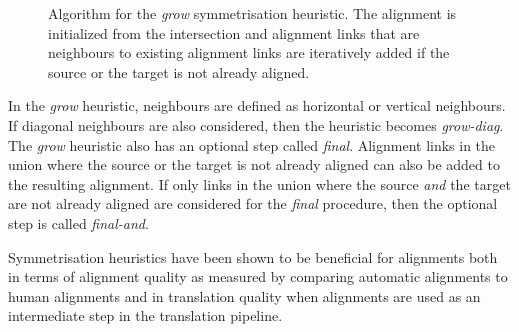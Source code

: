\begin{figure}
  \begin{algorithmic}[1]
       \hypertarget{alg:line:initGrow}{} \label{alg:line:initGrow}
             \hypertarget{alg:line:neighbours}{} \label{alg:line:neighbours}
               \hypertarget{alg:line:notAlreadyAligned}{} \label{alg:line:notAlreadyAligned}
                 \hypertarget{alg:line:addLink}{} \label{alg:line:addLink}
              \EndIf
            \EndFor
            \EndIf
          \EndFor
        \EndFor
        \EndIf
      \EndWhile
    \EndFunction
  \end{algorithmic}
  \caption{Algorithm for the \emph{grow} symmetrisation heuristic.
    The alignment is initialized from the intersection and alignment links
    that are neighbours to existing alignment links are iteratively added if the source
    or the target is not already aligned.}
  \label{alg:growHeuristic}
\end{figure}

In the \emph{grow} heuristic, neighbours are defined as horizontal or
vertical neighbours. If diagonal neighbours are also considered, then
the heuristic becomes \emph{grow-diag}. The \emph{grow} heuristic
also has an optional step called \emph{final}. Alignment
links in the union where the source or the target is not already
aligned can also be added to the resulting alignment. If only links
in the union where the source \emph{and} the target are not already
aligned are considered for the \emph{final} procedure, then
the optional step is called \emph{final-and}.

Symmetrisation heuristics have been shown to be beneficial for
alignments both in terms of alignment quality as measured
by comparing automatic alignments to human alignments and
in translation quality when alignments are used as an
intermediate step in the translation pipeline.

